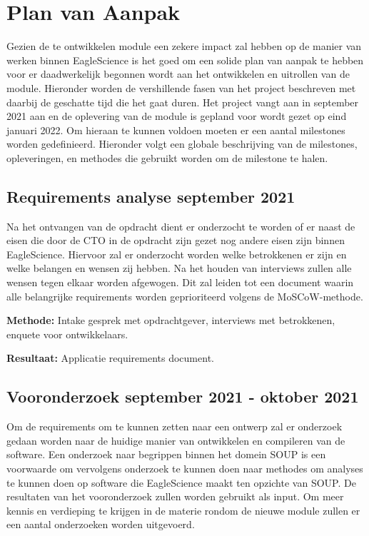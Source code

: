 
\chapter{Plan van Aanpak}\label{ch:planvanaanpak} %

Gezien de te ontwikkelen module een zekere impact zal hebben op de manier van werken binnen EagleScience is het goed om een solide plan van aanpak te hebben voor er daadwerkelijk begonnen wordt aan het ontwikkelen en uitrollen van de module. Hieronder worden de vershillende fasen van het project beschreven met daarbij de geschatte tijd die het gaat duren. Het project vangt aan in september 2021 aan en de oplevering van de module is gepland voor wordt gezet op eind januari 2022. Om hieraan te kunnen voldoen moeten er een aantal milestones worden gedefinieerd. Hieronder volgt een globale beschrijving van de milestones, opleveringen, en methodes die gebruikt worden om de milestone te halen.

\section{Requirements analyse \textbf{september 2021}}\label{sec:requirements-analyse}
Na het ontvangen van de opdracht dient er onderzocht te worden of er naast de eisen die door de CTO in de opdracht zijn gezet nog andere eisen zijn binnen EagleScience. Hiervoor zal er onderzocht worden welke betrokkenen er zijn en welke belangen en wensen zij hebben. Na het houden van interviews zullen alle wensen tegen elkaar worden afgewogen. Dit zal leiden tot een document waarin alle belangrijke requirements worden geprioriteerd volgens de MoSCoW-methode.

\textbf{Methode:} Intake gesprek met opdrachtgever, interviews met betrokkenen, enquete voor ontwikkelaars.

\textbf{Resultaat:} Applicatie requirements document. %

\section{Vooronderzoek \textbf{september 2021 - oktober 2021 }}\label{sec:onderzoek}
Om de requirements om te kunnen zetten naar een ontwerp zal er onderzoek gedaan worden naar de huidige manier van ontwikkelen en compileren van de software. Een onderzoek naar begrippen binnen het domein SOUP is een voorwaarde om vervolgens onderzoek te kunnen doen naar methodes om analyses te kunnen doen op software die EagleScience maakt ten opzichte van SOUP. De resultaten van het vooronderzoek zullen worden gebruikt als input.
Om meer kennis en verdieping te krijgen in de materie rondom de nieuwe module zullen er een aantal onderzoeken worden uitgevoerd.


